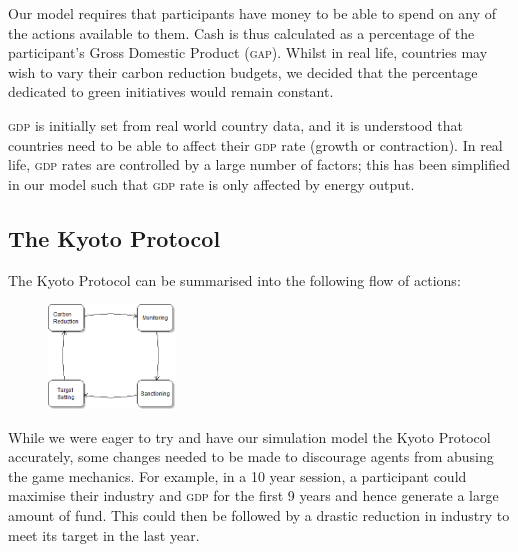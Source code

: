 Our model requires that participants have money to be able to spend on any of the actions available to them. Cash is thus calculated as a percentage of the participant's Gross Domestic Product (\textsc{gap}). Whilst in real life, countries may wish to vary their carbon reduction budgets, we decided that the percentage dedicated to green initiatives would remain constant.

\textsc{gdp} is initially set from real world country data, and it is understood that countries need to be able to affect their \textsc{gdp} rate (growth or contraction). In real life, \textsc{gdp} rates are controlled by a large number of factors; this has been simplified in our model such that \textsc{gdp} rate is only affected by energy output.

\subsection{The Kyoto Protocol}
The Kyoto Protocol can be summarised into the following flow of actions:

\begin{figure}[h!]
	\centering
	\includegraphics[width=0.3\textwidth]{img/Kyoto_4_states.png}
	\label{fig:kyoto_4_states}
\end{figure}

While we were eager to try and have our simulation model the Kyoto Protocol accurately, some changes needed to be made to discourage agents from abusing the game mechanics. For example, in a 10 year session, a participant could maximise their industry and \textsc{gdp} for the first 9 years and hence generate a large amount of fund. This could then be followed by a drastic reduction in industry to meet its target in the last year.

